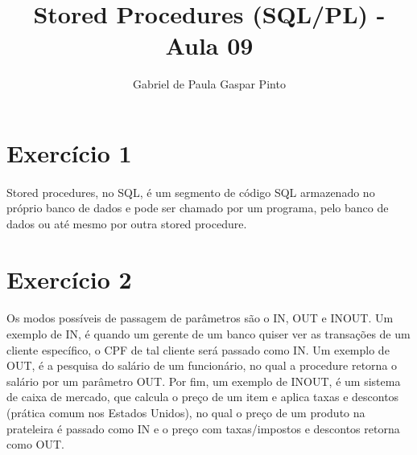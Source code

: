 \documentclass{article}
\title{Stored Procedures (SQL/PL) - Aula 09}
\author{Gabriel de Paula Gaspar Pinto}
\date{}
\begin{document}
\maketitle

\section*{Exercício 1}
    \paragraph{} Stored procedures, no SQL, é um segmento de código SQL armazenado no próprio banco de dados e pode ser chamado por um programa, pelo banco de dados ou até mesmo por outra stored procedure.

\section*{Exercício 2}
    \paragraph{} Os modos possíveis de passagem de parâmetros são o IN, OUT e INOUT. Um exemplo de IN, é quando um gerente de um banco quiser ver as transações de um cliente específico, o CPF de tal cliente será passado como IN. Um exemplo de OUT, é a pesquisa do salário de um funcionário, no qual a procedure retorna o salário por um parâmetro OUT. Por fim, um exemplo de INOUT, é um sistema de caixa de mercado, que calcula o preço de um item e aplica taxas e descontos (prática comum nos Estados Unidos), no qual o preço de um produto na prateleira é passado como IN e o preço com taxas/impostos e descontos retorna como OUT. 
\end{document}
